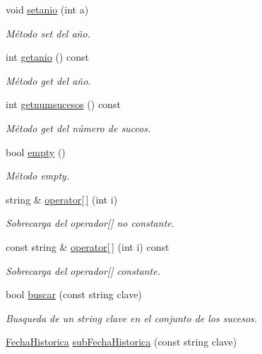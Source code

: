 \begin{DoxyCompactItemize}
void \hyperlink{classFechaHistorica_a2b82d1369c122baef3ac53730d4a707e}{setanio} (int a)
\begin{DoxyCompactList}\small\item\em Método set del año. \end{DoxyCompactList}\item 
int \hyperlink{classFechaHistorica_a654f1222c7ed4f033219a801a9c7d6a8}{getanio} () const
\begin{DoxyCompactList}\small\item\em Método get del año. \end{DoxyCompactList}\item 
int \hyperlink{classFechaHistorica_ab517ddfc3c58240112cb6181c5292809}{getnumsucesos} () const
\begin{DoxyCompactList}\small\item\em Método get del número de suceos. \end{DoxyCompactList}\item 
bool \hyperlink{classFechaHistorica_a4376f1b3e2b6578bf28cfdfe48808c25}{empty} ()
\begin{DoxyCompactList}\small\item\em Método empty. \end{DoxyCompactList}\item 
string \& \hyperlink{classFechaHistorica_afc31e709bf06376a8bb516a03cc1ed3a}{operator\mbox{[}$\,$\mbox{]}} (int i)
\begin{DoxyCompactList}\small\item\em Sobrecarga del operador\mbox{[}\mbox{]} no constante. \end{DoxyCompactList}\item 
const string \& \hyperlink{classFechaHistorica_a5e7a2f86e52919a9e356711a202d9391}{operator\mbox{[}$\,$\mbox{]}} (int i) const
\begin{DoxyCompactList}\small\item\em Sobrecarga del operador\mbox{[}\mbox{]} constante. \end{DoxyCompactList}\item 
bool \hyperlink{classFechaHistorica_a7ce7b47796ace7e68af6d6c812134128}{buscar} (const string clave)
\begin{DoxyCompactList}\small\item\em Busqueda de un string clave en el conjunto de los sucesos. \end{DoxyCompactList}\item 
\hyperlink{classFechaHistorica}{Fecha\+Historica} \hyperlink{classFechaHistorica_a3e3c2ceca06fa2c982daec425c933568}{sub\+Fecha\+Historica} (const string clave)

\end{DoxyCompactItemize}
